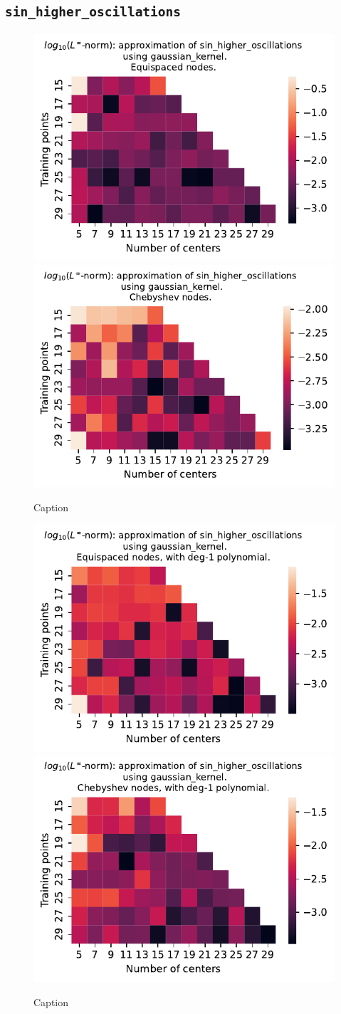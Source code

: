 \documentclass[12pt]{report} %
\begin{document}
\subsection*{\texttt{sin\_higher\_oscillations}}

\begin{figure}[ht]
  \centering

  \includegraphics[width=.49\textwidth]{imagenes/experiments/1d/variational/sin_higher_oscillations-Kgaussian_kernel-Equi.pdf}
  \includegraphics[width=.49\textwidth]{imagenes/experiments/1d/variational/sin_higher_oscillations-Kgaussian_kernel-Cheb.pdf}
  \caption{Caption}
  \label{fig:sin-higher-oscillations-gaussian}
\end{figure}

\begin{figure}[ht]
  \centering

  \includegraphics[width=.49\textwidth]{imagenes/experiments/1d/variational/sin_higher_oscillations-Kgaussian_kernel-Poly-Equi.pdf}
  \includegraphics[width=.49\textwidth]{imagenes/experiments/1d/variational/sin_higher_oscillations-Kgaussian_kernel-Poly-Cheb.pdf}
  \caption{Caption}
  \label{fig:sin-higher-oscillations-gaussian-poly}
\end{figure}
\end{document}
